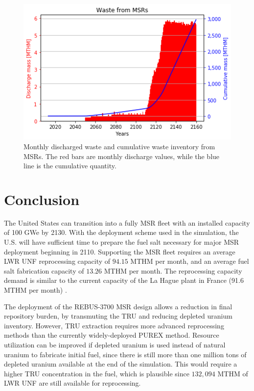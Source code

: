 \begin{figure}[htbp!]
	\begin{center}
		\includegraphics[scale=0.7]{./images/us/msr_waste.png}
	\end{center}
	\caption{Monthly discharged waste and cumulative waste inventory from
			\glspl{MSR}. The red bars are monthly discharge values, while
			the blue line is the cumulative quantity.}
	\label{fig:msr_waste}
\end{figure}


\section{Conclusion}
The United States can transition into a fully \gls{MSR} fleet with an
installed capacity of 100 GWe by 2130. With the deployment
scheme used in the simulation, the U.S. will have sufficient
time to prepare the fuel salt necessary for major \gls{MSR} deployment
beginning in 2110. Supporting the \gls{MSR} fleet requires an average
\gls{LWR} \gls{UNF} reprocessing capacity of $94.15$ MTHM per month, and an average fuel salt
fabrication capacity of $13.26$ MTHM per month. The reprocessing capacity demand is similar to the
current capacity of the La Hague plant in France (91.6 MTHM per month) \cite{schneider_spent_2008}.

The deployment of the REBUS-3700 \gls{MSR} design allows a reduction
in final repository burden, by transmuting the \gls{TRU} and reducing depleted uranium inventory.
However, \gls{TRU} extraction requires more advanced reprocessing methods than the currently
widely-deployed PUREX method. Resource utilization can be improved if depleted
uranium is used instead of natural uranium to fabricate initial fuel, since
there is still more than one million tons of depleted uranium available at the
end of the simulation. This would require a higher \gls{TRU} concentration
in the fuel, which is plausible since $132,094$ MTHM of \gls{LWR} \gls{UNF}
are still available for reprocessing.

